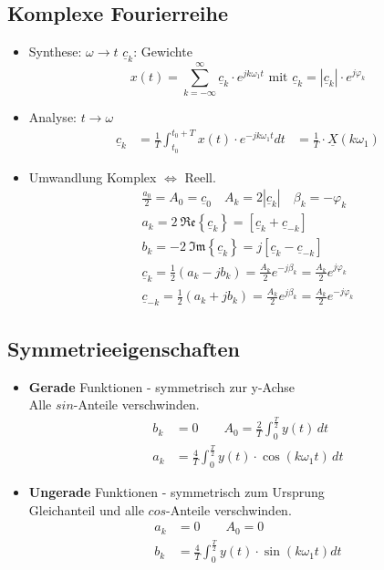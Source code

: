 \subsection{Komplexe Fourierreihe}
	\begin{itemize}
		\item Synthese: $\omega \rightarrow t$
		{\small\quad $\underline{c}_k$: Gewichte}
		\[
		x(t)= \sum_{k=-\infty}^{\infty} \underline{c}_k\cdot e^{jk \omega_1  t} \text{ mit } \underline{c}_k = |\underline{c}_k|\cdot e^{j\varphi_k}
		\]
		\item Analyse: $t \rightarrow \omega$
		\begin{align*}
			\underline{c}_k & = \frac{1}{T}\int_{t_0}^{t_0+T} x(t)\cdot e^{-jk\omega_1  t}dt
			& = \boxed{\frac{1}{T} \cdot \underline{X}(k\omega_1) }
		\end{align*}
	\item Umwandlung Komplex $\Leftrightarrow$ Reell.
	\begin{gather*}
		\frac{a_0}{2} = A_0 = \underline{c}_0 \quad A_k = 2|\underline{c}_k| \quad \beta_k = -\varphi_k\\
			a_k = 2\ \mathfrak{Re}\left\{ \underline{c}_k \right\}= \left[ \underline{c}_k+\underline{c}_{-k} \right]\\
			b_k = -2\ \mathfrak{Im}\left\{ \underline{c}_k \right\}= j\left[ \underline{c}_k-\underline{c}_{-k} \right]\\
			\underline{c}_k = \frac{1}{2}\left( a_k-jb_k \right) = \frac{A_k}{2} e^{-j\beta_k} = \frac{A_k}{2} e^{j\varphi_k}\\
			\underline{c}_{-k} = \frac{1}{2}\left( a_k+jb_k \right) = \frac{A_k}{2} e^{j\beta_k} = \frac{A_k}{2} e^{-j\varphi_k}
	\end{gather*}
	\end{itemize}




\subsection{Symmetrieeigenschaften}
\begin{itemize}
	\item \textbf{Gerade} Funktionen
	      - symmetrisch zur y-Achse\\
	     {\small Alle $sin$-Anteile verschwinden.}
	     \begin{align*}
	     	b_k &=0 \qquad
	     	A_0 = \frac{2}{T}\int^{\frac{T}{2}}_{0} y(t)\,dt\\
	     	a_{k} &= \frac{4}{T}\int^{\frac{T}{2}}_{0}y(t)\cdot \cos(k\omega_1t)\,dt
	     \end{align*}
	\item \textbf{Ungerade} Funktionen
	      - symmetrisch zum Ursprung\\
	  		{\small Gleichanteil und alle $cos$-Anteile verschwinden.}
	      \begin{align*}
	      	a_k &=0 \qquad
	      	A_0 = 0\\
	      	b_{k} &= \frac{4}{T}\int^{\frac{T}{2}}_{0}y(t)\cdot \sin(k\omega_1t) dt
	      \end{align*}
\end{itemize}
